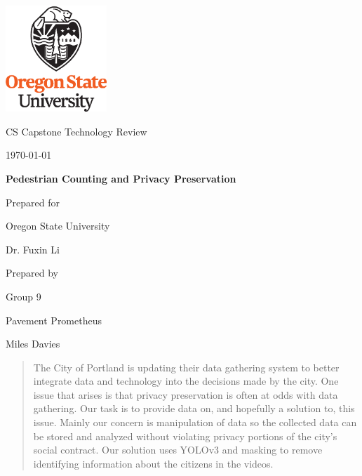 \documentclass[onecolumn, draftclsnofoot,10pt, compsoc]{IEEEtran}
\def \CapstoneTeamName{		Pavement Prometheus}
\def \CapstoneTeamNumber{		9}
\def \GroupMemberOne{			Miles Davies  }
\def \CapstoneProjectName{		Pedestrian Counting and Privacy Preservation}
\def \CapstoneSponsorCompany{	Oregon State University}
\def \CapstoneSponsorPerson{		Dr. Fuxin Li}
\def \DocType{		%
				Technology Review
				}
\newcommand{\NameSigPair}[1]{\par
\makebox[2.75in][r]{#1} \hfil 	\makebox[3.25in]{\makebox[2.25in]{\hrulefill} \hfill		\makebox[.75in]{\hrulefill}}
\par\vspace{-12pt} \textit{\tiny\noindent
\makebox[2.75in]{} \hfil		\makebox[3.25in]{\makebox[2.25in][r]{Signature} \hfill	\makebox[.75in][r]{Date}}}}
\renewcommand{\NameSigPair}[1]{#1}
\begin{document}
\begin{titlepage}
    \begin{singlespace}
    	\includegraphics[height=4cm]{images/OSU_vertical_2C_O_over_B.eps}
        \hfill 
        \par\vspace{.2in}
        \centering
        \scshape{
            \huge CS Capstone \DocType \par
            {\large\today}\par
            \vspace{.5in}
            \textbf{\Huge\CapstoneProjectName}\par
            {\large Prepared for}\par
            \Huge \CapstoneSponsorCompany\par
            \vspace{5pt}
            {\Large\NameSigPair{\CapstoneSponsorPerson}\par}
            {\large Prepared by }\par
            Group\CapstoneTeamNumber\par
            \CapstoneTeamName\par 
            \vspace{5pt}
            {\Large
                \NameSigPair{\GroupMemberOne}\par
            }
            \vspace{20pt}
        }
        \begin{abstract}
        The City of Portland is updating their data gathering system to better integrate data and technology into the decisions made by the city. One issue that arises is that privacy preservation is often at odds with data gathering. Our task is to provide data on, and hopefully a solution to, this issue. Mainly our concern is manipulation of data so the collected data can be stored and analyzed without violating privacy portions of the city's social contract. Our solution uses YOLOv3 and masking to remove identifying information about the citizens in the videos.
        \end{abstract}    
    \end{singlespace}
\end{titlepage}
\newpage
{}
\tableofcontents
\clearpage
\end{document}
